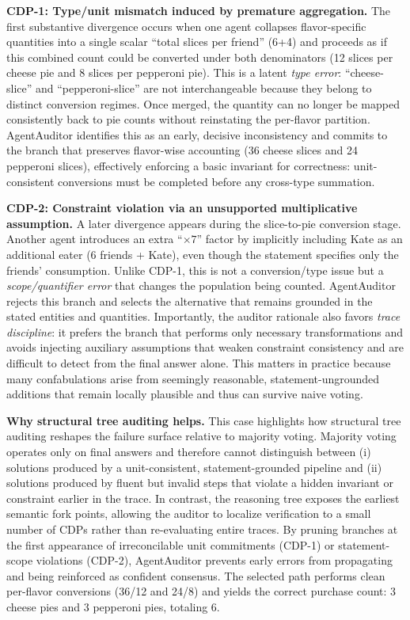 \documentclass{article}
\theoremstyle{plain}
\theoremstyle{definition}
\theoremstyle{remark}
\begin{document}
\textbf{CDP-1: Type/unit mismatch induced by premature aggregation.}
The first substantive divergence occurs when one agent collapses flavor-specific quantities into a single scalar ``total slices per friend'' (6+4) and proceeds as if this combined count could be converted under both denominators (12 slices per cheese pie and 8 slices per pepperoni pie). This is a latent \emph{type error}: ``cheese-slice'' and ``pepperoni-slice'' are not interchangeable because they belong to distinct conversion regimes. Once merged, the quantity can no longer be mapped consistently back to pie counts without reinstating the per-flavor partition. AgentAuditor identifies this as an early, decisive inconsistency and commits to the branch that preserves flavor-wise accounting (36 cheese slices and 24 pepperoni slices), effectively enforcing a basic invariant for correctness: unit-consistent conversions must be completed before any cross-type summation.

\textbf{CDP-2: Constraint violation via an unsupported multiplicative assumption.}
A later divergence appears during the slice-to-pie conversion stage. Another agent introduces an extra ``$\times 7$'' factor by implicitly including Kate as an additional eater (6 friends + Kate), even though the statement specifies only the friends' consumption. Unlike CDP-1, this is not a conversion/type issue but a \emph{scope/quantifier error} that changes the population being counted. AgentAuditor rejects this branch and selects the alternative that remains grounded in the stated entities and quantities. Importantly, the auditor rationale also favors \emph{trace discipline}: it prefers the branch that performs only necessary transformations and avoids injecting auxiliary assumptions that weaken constraint consistency and are difficult to detect from the final answer alone. This matters in practice because many confabulations arise from seemingly reasonable, statement-ungrounded additions that remain locally plausible and thus can survive naive voting.

\textbf{Why structural tree auditing helps.}
This case highlights how structural tree auditing reshapes the failure surface relative to majority voting. Majority voting operates only on final answers and therefore cannot distinguish between (i) solutions produced by a unit-consistent, statement-grounded pipeline and (ii) solutions produced by fluent but invalid steps that violate a hidden invariant or constraint earlier in the trace. In contrast, the reasoning tree exposes the earliest semantic fork points, allowing the auditor to localize verification to a small number of CDPs rather than re-evaluating entire traces. By pruning branches at the first appearance of irreconcilable unit commitments (CDP-1) or statement-scope violations (CDP-2), AgentAuditor prevents early errors from propagating and being reinforced as confident consensus. The selected path performs clean per-flavor conversions (36/12 and 24/8) and yields the correct purchase count: 3 cheese pies and 3 pepperoni pies, totaling 6.
\end{document}
